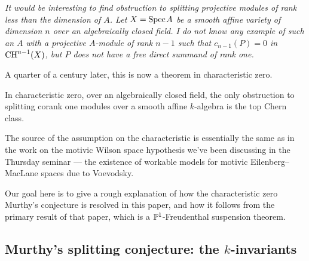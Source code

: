 \documentclass[11pt,openany]{book}
\newcommand{\quoteblock}[2]{\epigraph{\itshape#1}{#2}}
\begin{document}
\quoteblock{It would be interesting to find obstruction to splitting projective modules of rank less than the dimension of $A$. Let $X = \Spec A$ be a smooth affine variety of dimension $n$ over an algebraically closed field. I do not know any example of such an $A$ with a projective $A$-module of rank $n-1$ such that $c_{n-1}(P) = 0$ in $\CH^{n-1}(X)$, but $P$ does not have a free direct summand of rank one.}{\cite[p.~173]{Murthy-survey}}

A quarter of a century later, this is now a theorem in characteristic zero.

\begin{theorem} In characteristic zero, over an algebraically closed field, the only obstruction to splitting corank one modules over a smooth affine $k$-algebra is the top Chern class.
\end{theorem}

The source of the assumption on the characteristic is essentially the same as in the work on the motivic Wilson space hypothesis we've been discussing in the Thursday seminar --- the existence of workable models for motivic Eilenberg--MacLane spaces due to Voevodsky.

Our goal here is to give a rough explanation of how the characteristic zero Murthy's conjecture is resolved in this paper, and how it follows from the primary result of that paper, which is a $\P^1$-Freudenthal suspension theorem.

\subsection{Murthy's splitting conjecture: the $k$-invariants}
\end{document}
